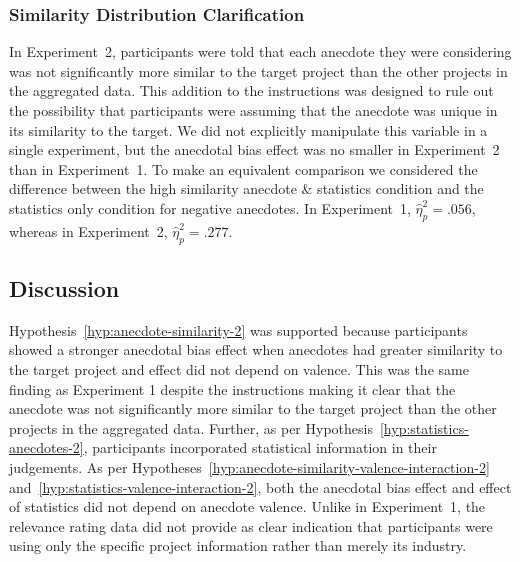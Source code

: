 \documentclass[
  man, donotrepeattitle,floatsintext]{apa7}
\theoremstyle{definition}
\theoremstyle{definition}
\theoremstyle{definition}
\theoremstyle{definition}
\theoremstyle{remark}
\begin{document}
\hypertarget{similarity-distribution-clarification}{%
\subsubsection{Similarity Distribution Clarification}\label{similarity-distribution-clarification}}

In Experiment~2, participants were told that each anecdote they were considering
was not significantly more similar to the target project than the other projects
in the aggregated data. This addition to the instructions was designed to rule
out the possibility that participants were assuming that the anecdote was unique
in its similarity to the target. We did not explicitly manipulate this variable
in a single experiment, but the anecdotal bias effect was no smaller in
Experiment~2 than in Experiment~1. To make an equivalent comparison we
considered the difference between the high similarity anecdote \& statistics
condition and the statistics only condition for negative anecdotes. In
Experiment~1, \(\hat{\eta}^2_p = .056\), whereas in
Experiment~2, \(\hat{\eta}^2_p = .277\).

\hypertarget{discussion-1}{%
\subsection{Discussion}\label{discussion-1}}

Hypothesis~\ref{hyp:anecdote-similarity-2} was supported because participants
showed a stronger anecdotal bias effect when anecdotes had greater similarity to
the target project and effect did not depend on valence. This was the same
finding as Experiment 1 despite the instructions making it clear that the
anecdote was not significantly more similar to the target project than the other
projects in the aggregated data. Further, as per
Hypothesis~\ref{hyp:statistics-anecdotes-2}, participants incorporated
statistical information in their judgements. As per
Hypotheses~\ref{hyp:anecdote-similarity-valence-interaction-2}
and~\ref{hyp:statistics-valence-interaction-2}, both the anecdotal bias effect
and effect of statistics did not depend on anecdote valence. Unlike in
Experiment~1, the relevance rating data did not provide as clear indication that
participants were using only the specific project information rather than merely
its industry.
\end{document}
